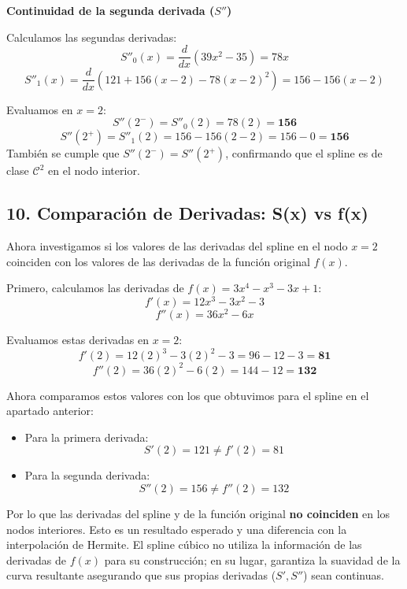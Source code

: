 \documentclass{article}
\begin{document}
\vspace{1cm}

\textbf{Continuidad de la segunda derivada ($S''$) }

Calculamos las segundas derivadas:
$$ S''_0(x) = \frac{d}{dx}(39x^2 - 35) = 78x $$
$$ S''_1(x) = \frac{d}{dx}\left(121 + 156(x-2) - 78(x-2)^2\right) = 156 - 156(x-2) $$

Evaluamos en $x=2$:
$$ S''(2^-) = S''_0(2) = 78(2) = \mathbf{156} $$
$$ S''(2^+) = S''_1(2) = 156 - 156(2-2) = 156 - 0 = \mathbf{156} $$
También se cumple que $S''(2^-) = S''(2^+)$, confirmando que el spline es de clase $\mathcal{C}^2$ en el nodo interior.



\subsection*{10. Comparación de Derivadas: S(x) vs f(x)}

Ahora investigamos si los valores de las derivadas del spline en el nodo $x=2$ coinciden con los valores de las derivadas de la función original $f(x)$.

Primero, calculamos las derivadas de $f(x) = 3x^4 - x^3 - 3x + 1$:
$$ f'(x) = 12x^3 - 3x^2 - 3 $$
$$ f''(x) = 36x^2 - 6x $$

Evaluamos estas derivadas en $x=2$:
$$ f'(2) = 12(2)^3 - 3(2)^2 - 3 = 96 - 12 - 3 = \mathbf{81} $$
$$ f''(2) = 36(2)^2 - 6(2) = 144 - 12 = \mathbf{132} $$

Ahora comparamos estos valores con los que obtuvimos para el spline en el apartado anterior:
\begin{itemize}
    \item Para la primera derivada: $$ S'(2) = 121 \neq f'(2) = 81 $$
    \item Para la segunda derivada: $$ S''(2) = 156 \neq f''(2) = 132 $$
\end{itemize}

Por lo que las derivadas del spline y de la función original \textbf{no coinciden} en los nodos interiores. Esto es un resultado esperado y una diferencia con la interpolación de Hermite. El spline cúbico no utiliza la información de las derivadas de $f(x)$ para su construcción; en su lugar, garantiza la suavidad de la curva resultante asegurando que sus propias derivadas ($S', S''$) sean continuas.




\end{document}
